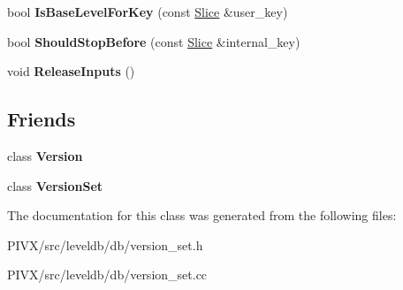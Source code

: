 \begin{DoxyCompactItemize}
bool {\bfseries Is\+Base\+Level\+For\+Key} (const \mbox{\hyperlink{classleveldb_1_1_slice}{Slice}} \&user\+\_\+key)
\item 
\mbox{\label{classleveldb_1_1_compaction_a07624423bb512fedb358a008a38fa0b9}} 
bool {\bfseries Should\+Stop\+Before} (const \mbox{\hyperlink{classleveldb_1_1_slice}{Slice}} \&internal\+\_\+key)
\item 
\mbox{\label{classleveldb_1_1_compaction_a87ec90747d22dce0d103149db1ecf709}} 
void {\bfseries Release\+Inputs} ()
\end{DoxyCompactItemize}
\subsection*{Friends}
\begin{DoxyCompactItemize}
\item 
\mbox{\label{classleveldb_1_1_compaction_ace162f32d4abb584945d3a55a389b0a3}} 
class {\bfseries Version}
\item 
\mbox{\label{classleveldb_1_1_compaction_a1827cd1b4d6e9e3c378ce37ca3cce635}} 
class {\bfseries Version\+Set}
\end{DoxyCompactItemize}


The documentation for this class was generated from the following files\+:\begin{DoxyCompactItemize}
\item 
P\+I\+V\+X/src/leveldb/db/version\+\_\+set.\+h\item 
P\+I\+V\+X/src/leveldb/db/version\+\_\+set.\+cc\end{DoxyCompactItemize}
